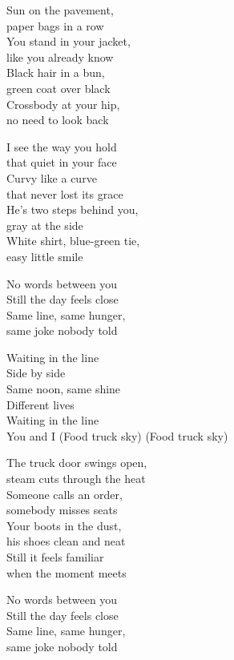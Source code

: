 \begin{lyrics}

Sun on the pavement,\\
paper bags in a row\\
You stand in your jacket,\\
like you already know\\
Black hair in a bun,\\
green coat over black\\
Crossbody at your hip,\\
no need to look back

I see the way you hold\\
that quiet in your face\\
Curvy like a curve\\
that never lost its grace\\
He’s two steps behind you,\\
gray at the side\\
White shirt, blue-green tie,\\
easy little smile

No words between you\\
Still the day feels close\\
Same line, same hunger,\\
same joke nobody told

Waiting in the line\\
Side by side\\
Same noon, same shine\\
Different lives\\
Waiting in the line\\
You and I
(Food truck sky)
(Food truck sky)

The truck door swings open,\\
steam cuts through the heat\\
Someone calls an order,\\
somebody misses seats\\
Your boots in the dust,\\
his shoes clean and neat\\
Still it feels familiar\\
when the moment meets

No words between you\\
Still the day feels close\\
Same line, same hunger,\\
same joke nobody told


\end{lyrics}
